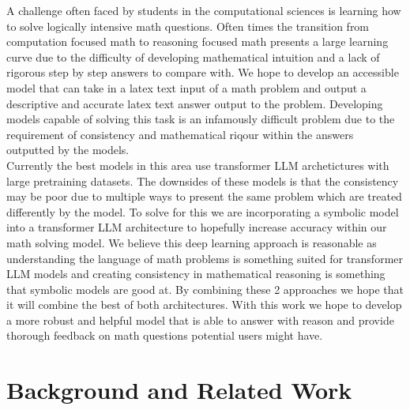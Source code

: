 \documentclass{article}
\begin{document}
A challenge often faced by students in the computational sciences 
is learning how to solve logically intensive math questions. 
Often times the transition from computation focused math to reasoning 
focused math presents a large learning curve due to the difficulty of 
developing mathematical intuition and a lack of rigorous step by step 
answers to compare with. We hope to develop an accessible model that can 
take in a latex text input of a math problem and output a descriptive and accurate latex text answer output to the problem. 
Developing models capable of solving this task is an infamously difficult problem \cite{Unsal_Gehr_Vechev_2024} due to the requirement of consistency and mathematical riqour within the answers outputted by the models. 
\\
Currently the best models in this area use transformer LLM archetictures with large pretraining datasets. 
The downsides of these models is that the consistency may be poor due to multiple ways to present the same problem which are treated differently by the model.
To solve for this we are incorporating a symbolic model into a transformer LLM architecture to hopefully increase accuracy within our math solving model.
 We believe this deep learning approach is reasonable as understanding the language of math problems is something suited for transformer LLM models and creating consistency in mathematical reasoning is something that symbolic models are good at. By combining these 2 approaches we hope that it will combine the best of both architectures.  With this work we hope to develop a more robust and helpful model that is able to answer with reason and provide thorough feedback on math questions potential users might have.

 \section{Background and Related Work}

\end{document}
